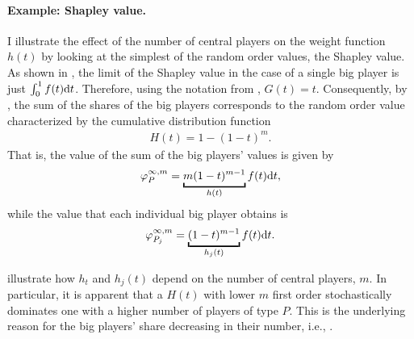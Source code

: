 \paragraph{Example: Shapley value.}
I illustrate the effect of the number of central players on the weight function $h(t)$ by looking at the simplest of the random order values, the Shapley value.
As shown in , the limit of the Shapley value in the case of a single big player is just $\int_0^1 f(t) \mathrm{d}t$.
Therefore, using the notation from , $G(t) = t$.
Consequently, by , the sum of the shares of the big players corresponds to the random order value characterized by the cumulative distribution function
\begin{align} 
    H(t) = 1 - (1 - t)^m.  \label{eq:weight_function_shapley}
\end{align}
That is, the value of the sum of the big players' values is given by
\begin{align*}
    \varphi_P^{\infty, m} = \underbracket{m (1-t) ^ {m-1}}_{h(t)} f(t) \dt,
\end{align*}
while the value that each individual big player obtains is
\begin{align*}
    \varphi_{P_j}^{\infty, m} = \underbracket{(1-t) ^ {m-1}}_{h_j(t)} f(t) \dt.
\end{align*}

 illustrate how $h_t$ and $h_j(t)$ depend on the number of central players, $m$.
In particular, it is apparent that a $H(t)$ with lower $m$ first order stochastically dominates one with a higher number of players of type $P$.
This is the underlying reason for the big players' share decreasing in their number, i.e., .


